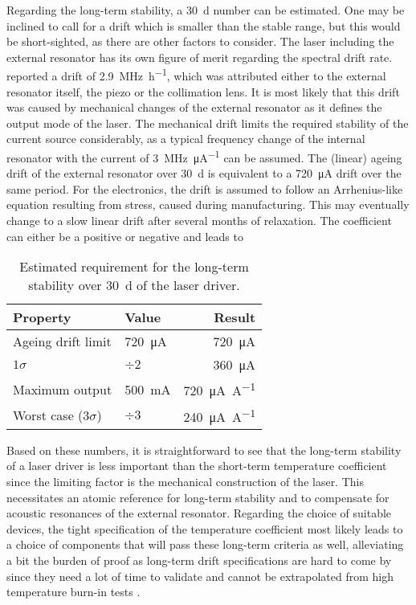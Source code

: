 Regarding the long-term stability, a \qty{30}{\day} number can be estimated. One may be inclined to call for a drift which is smaller than the stable range, but this would be short-sighted, as there are other factors to consider. The laser including the external resonator has its own figure of merit regarding the spectral drift rate. \citeauthor{ecdl_stability} \cite{ecdl_stability} reported a drift of \qty{2.9}{\MHz \per \hour}, which was attributed either to the external resonator itself, the piezo or the collimation lens. It is most likely that this drift was caused by mechanical changes of the external resonator as it defines the output mode of the laser. The mechanical drift limits the required stability of the current source considerably, as a typical frequency change of the internal resonator with the current of \qty[per-mode=symbol]{3}{\MHz \per \micro \A} \cite{diodelaser_modulation} can be assumed. The (linear) ageing drift of the external resonator over \qty{30}{\day} is equivalent to a \qty{720}{\uA} drift over the same period. For the electronics, the drift is assumed to follow an Arrhenius-like equation resulting from stress, caused during manufacturing. This may eventually change to a slow linear drift after several months of relaxation. The coefficient can either be a positive or negative and leads to
\begin{table}[hb]
    \centering
    \begin{tabular}{llr}
        \toprule
        Property& Value& Result \\
        \midrule
        Ageing drift limit & \qty{720}{\uA}& \qty{720}{\uA}\\
        $1 \sigma$  & $\div 2$& \qty{360}{\uA} \\
        Maximum output& \qty{500}{\mA}& \qty{720}{\uA \per \A}\\
        Worst case ($3 \sigma$)& $\div 3$& \qty{240}{\uA \per \A}\\
        \bottomrule
    \end{tabular}
    \caption{Estimated requirement for the long-term stability over \qty{30}{\day} of the laser driver.}
    \label{tab:dgdrive_stability}
\end{table}

Based on these numbers, it is straightforward to see that the long-term stability of a laser driver is less important than the short-term temperature coefficient since the limiting factor is the mechanical construction of the laser. This necessitates an atomic reference for long-term stability and to compensate for acoustic resonances of the external resonator. Regarding the choice of suitable devices, the tight specification of the temperature coefficient most likely leads to a choice of components that will pass these long-term criteria as well, alleviating a bit the burden of proof as long-term drift specifications are hard to come by since they need a lot of time to validate and cannot be extrapolated from high temperature burn-in tests \cite{voltage_reference_drift}.


